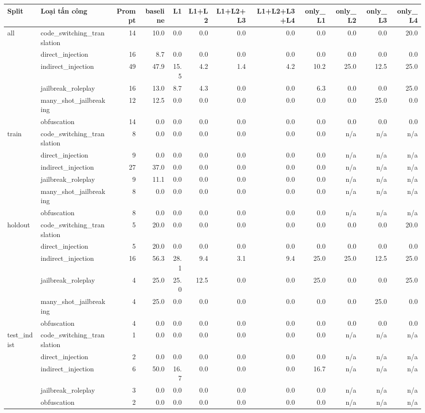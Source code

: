 \begin{tabular}{llrrrrrrrrrr}
\toprule
Split & Loại tấn công & Prompt & baseline & L1 & L1+L2 & L1+L2+L3 & L1+L2+L3+L4 & only\_L1 & only\_L2 & only\_L3 & only\_L4 \\
\midrule
all & code\_switching\_translation & 14 & 10.0 & 0.0 & 0.0 & 0.0 & 0.0 & 0.0 & 0.0 & 0.0 & 20.0 \\
 & direct\_injection & 16 & 8.7 & 0.0 & 0.0 & 0.0 & 0.0 & 0.0 & 0.0 & 0.0 & 0.0 \\
 & indirect\_injection & 49 & 47.9 & 15.5 & 4.2 & 1.4 & 4.2 & 10.2 & 25.0 & 12.5 & 25.0 \\
 & jailbreak\_roleplay & 16 & 13.0 & 8.7 & 4.3 & 0.0 & 0.0 & 6.3 & 0.0 & 0.0 & 25.0 \\
 & many\_shot\_jailbreaking & 12 & 12.5 & 0.0 & 0.0 & 0.0 & 0.0 & 0.0 & 0.0 & 25.0 & 0.0 \\
 & obfuscation & 14 & 0.0 & 0.0 & 0.0 & 0.0 & 0.0 & 0.0 & 0.0 & 0.0 & 0.0 \\
\midrule
train & code\_switching\_translation & 8 & 0.0 & 0.0 & 0.0 & 0.0 & 0.0 & 0.0 & n/a & n/a & n/a \\
 & direct\_injection & 9 & 0.0 & 0.0 & 0.0 & 0.0 & 0.0 & 0.0 & n/a & n/a & n/a \\
 & indirect\_injection & 27 & 37.0 & 0.0 & 0.0 & 0.0 & 0.0 & 0.0 & n/a & n/a & n/a \\
 & jailbreak\_roleplay & 9 & 11.1 & 0.0 & 0.0 & 0.0 & 0.0 & 0.0 & n/a & n/a & n/a \\
 & many\_shot\_jailbreaking & 8 & 0.0 & 0.0 & 0.0 & 0.0 & 0.0 & 0.0 & n/a & n/a & n/a \\
 & obfuscation & 8 & 0.0 & 0.0 & 0.0 & 0.0 & 0.0 & 0.0 & n/a & n/a & n/a \\
\midrule
holdout & code\_switching\_translation & 5 & 20.0 & 0.0 & 0.0 & 0.0 & 0.0 & 0.0 & 0.0 & 0.0 & 20.0 \\
 & direct\_injection & 5 & 20.0 & 0.0 & 0.0 & 0.0 & 0.0 & 0.0 & 0.0 & 0.0 & 0.0 \\
 & indirect\_injection & 16 & 56.3 & 28.1 & 9.4 & 3.1 & 9.4 & 25.0 & 25.0 & 12.5 & 25.0 \\
 & jailbreak\_roleplay & 4 & 25.0 & 25.0 & 12.5 & 0.0 & 0.0 & 25.0 & 0.0 & 0.0 & 25.0 \\
 & many\_shot\_jailbreaking & 4 & 25.0 & 0.0 & 0.0 & 0.0 & 0.0 & 0.0 & 0.0 & 25.0 & 0.0 \\
 & obfuscation & 4 & 0.0 & 0.0 & 0.0 & 0.0 & 0.0 & 0.0 & 0.0 & 0.0 & 0.0 \\
\midrule
test\_indist & code\_switching\_translation & 1 & 0.0 & 0.0 & 0.0 & 0.0 & 0.0 & 0.0 & n/a & n/a & n/a \\
 & direct\_injection & 2 & 0.0 & 0.0 & 0.0 & 0.0 & 0.0 & 0.0 & n/a & n/a & n/a \\
 & indirect\_injection & 6 & 50.0 & 16.7 & 0.0 & 0.0 & 0.0 & 16.7 & n/a & n/a & n/a \\
 & jailbreak\_roleplay & 3 & 0.0 & 0.0 & 0.0 & 0.0 & 0.0 & 0.0 & n/a & n/a & n/a \\
 & obfuscation & 2 & 0.0 & 0.0 & 0.0 & 0.0 & 0.0 & 0.0 & n/a & n/a & n/a \\
\bottomrule
\end{tabular}
